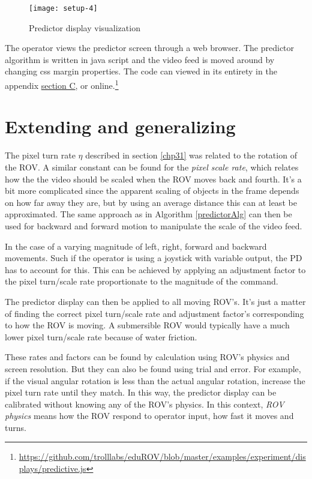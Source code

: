 \begin{figure}[h!]
    \centering
    \texttt{[image: setup-4]}
    \caption{Predictor display visualization}
    \label{predictorvis}
\end{figure}

\clearpage
\restoregeometry

The operator views the predictor screen through a web browser. The predictor algorithm is written in java script and the video feed is moved around by changing css margin properties. The code can viewed in its entirety in the appendix \hyperref[appPredict]{section C}, or online.\footnote{\url{https://github.com/trolllabs/eduROV/blob/master/examples/experiment/displays/predictive.js}}


\section{Extending and generalizing}\label{expand}

The pixel turn rate $\eta$ described in section \ref{chp31} was related to the rotation of the ROV. A similar constant can be found for the \emph{pixel scale rate}, which relates how the the video should be scaled when the ROV moves back and fourth. It's a bit more complicated since the apparent scaling of objects in the frame depends on how far away they are, but by using an average distance this can at least be approximated. The same approach as in Algorithm \ref{predictorAlg} can then be used for backward and forward motion to manipulate the scale of the video feed.

In the case of a varying magnitude of left, right, forward and backward movements. Such if the operator is using a joystick with variable output, the PD has to account for this. This can be achieved by applying an adjustment factor to the pixel turn/scale rate proportionate to the magnitude of the command.

The predictor display can then be applied to all moving ROV's. It's just a matter of finding the correct pixel turn/scale rate and adjustment factor's corresponding to how the ROV is moving. A submersible ROV would typically have a much lower pixel turn/scale rate because of water friction.

These rates and factors can be found by calculation using ROV's physics and screen resolution. But they can also be found using trial and error. For example, if the visual angular rotation is less than the actual angular rotation, increase the pixel turn rate until they match. In this way, the predictor display can be calibrated without knowing any of the ROV's physics. In this context, \emph{ROV physics} means how the ROV respond to operator input, how fast it moves and turns.